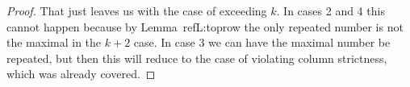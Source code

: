 \documentclass{amsart}
\begin{document}
\begin{proof}
  That just leaves us with the case of exceeding $k$. In cases 2 and 4 this cannot happen because by Lemma~ref{L:toprow} 
  the only repeated number is not the maximal in the $k+2$ case. In case 3 we can have the maximal number be repeated,
  but then this will reduce to the case of violating column strictness, which was already covered.
\end{proof}
\end{document}
